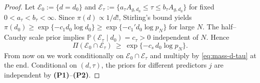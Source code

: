 \documentclass[11pt]{article}
\theoremstyle{plain}
\theoremstyle{definition}
\theoremstyle{plain}
\begin{document}
\begin{proof}
Let $\mathcal E_0:=\{d=d_0\}$ and $\mathcal E_\tau:=\{a_\tau A_{g,d_0}\le \tau\le b_\tau A_{g,d_0}\}$ for fixed $0<a_\tau<b_\tau<\infty$.
Since $\pi(d)\propto 1/d!$, Stirling’s bound yields $\pi(d_0)\ge \exp\{-c_1 d_0\log d_0\}\ge \exp\{-c_1' d_0\log p_N\}$ for large $N$.
The half–Cauchy scale prior implies $\mathbb P(\mathcal E_\tau\mid d_0)=c_\tau>0$ independent of $N$.
Hence
\begin{equation}\label{eq:mass-d-tau}
\Pi(\mathcal E_0\cap\mathcal E_\tau)\ \ge\ \exp\{-c_s\,d_0\log p_N\}.
\end{equation}
From now on we work conditionally on $\mathcal E_0\cap\mathcal E_\tau$ and multiply by \eqref{eq:mass-d-tau} at the end.
Conditional on $(d,\tau)$, the priors for different predictors $j$ are independent by {\textbf{(P1)}}–{\textbf{(P2)}}.


\end{proof}
\end{document}
